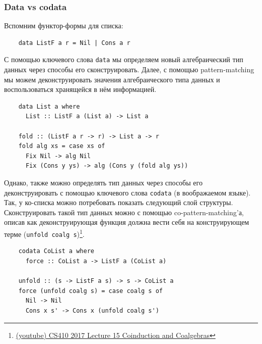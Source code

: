\subsubsection{Data vs codata} \label{subsubsec:data-codata}

Вспомним функтор-формы для списка:
\begin{verbatim}
    data ListF a r = Nil | Cons a r
\end{verbatim}

С помощью ключевого слова \texttt{data} мы определяем новый алгебраический тип данных через способы его сконструировать.
Далее, с помощью pattern-matching мы можем деконструировать значения алгебраического типа данных и воспользоваться хранящейся в нём информацией.
\begin{verbatim}
    data List a where
      List :: ListF a (List a) -> List a

    fold :: (ListF a r -> r) -> List a -> r
    fold alg xs = case xs of
      Fix Nil -> alg Nil
      Fix (Cons y ys) -> alg (Cons y (fold alg ys))
\end{verbatim}

Однако, также можно определять тип данных через способы его деконструировать с помощью ключевого слова \texttt{codata} (в воображаемом языке).
Так, у ко-списка можно потребовать показать следующий слой структуры.
Сконструировать такой тип данных можно с помощью co-pattern-matching'а, описав как деконструирующая функция должна вести себя на конструирующем терме (\texttt{unfold coalg s})\footnote{\href{https://youtu.be/ZCdYIEwcna0?si=XEQSBFhnehQFZPxy}{(youtube) CS410 2017 Lecture 15 Coinduction and Coalgebras}}.
\begin{verbatim}
    codata CoList a where
      force :: CoList a -> ListF a (CoList a)

    unfold :: (s -> ListF a s) -> s -> CoList a
    force (unfold coalg s) = case coalg s of
      Nil -> Nil
      Cons x s' -> Cons x (unfold coalg s')
\end{verbatim}

